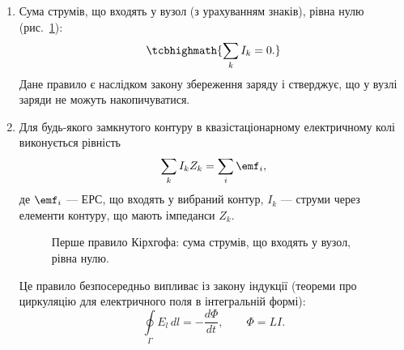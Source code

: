\begin{enumerate}

	\item  Сума струмів, що входять у вузол (з урахуванням знаків), рівна нулю
	      (рис.~\ref{tikz:Kirchhoff}):
	      \begin{equation}\label{eq:Kirchhoff_current}
		      \tcbhighmath{
			      \sum_k I_k = 0.
		      }
	      \end{equation}
	      Дане правило є наслідком закону збереження заряду і стверджує, що у вузлі заряди не можуть накопичуватися.

	\item Для будь-якого замкнутого контуру в квазістаціонарному електричному колі виконується рівність
	      \begin{equation}\label{eq:Kirchhoff_voltage}
		      \sum_k I_k Z_k = \sum_i \emf_i,
	      \end{equation}
	      де $\emf_i$ --- ЕРС, що входять у вибраний контур, $I_k$ --- струми через елементи контуру, що мають імпеданси $Z_k$.

	      \begin{figure}
		      \centering
		      \caption{Перше правило Кірхгофа: сума струмів, що входять у вузол, рівна нулю.}
		      \label{tikz:Kirchhoff}
	      \end{figure}

	      Це правило безпосередньо випливає із закону індукції (теореми про циркуляцію для електричного поля в інтегральній формі):
	      \begin{equation}\label{eq:circulation_EMF}
		      \oint\limits_{\Gamma} E_l \, dl = -\frac{d\Phi}{dt}, \qquad \Phi = LI.
	      \end{equation}

\end{enumerate}


